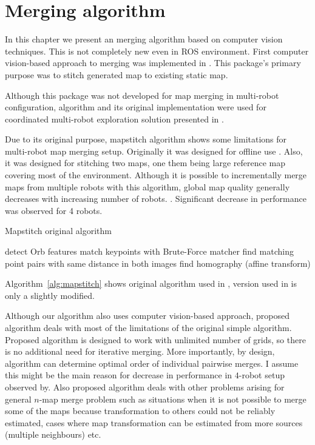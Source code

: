 \chapter{Merging algorithm}

In this chapter we present an merging algorithm based on computer vision techniques. This is not completely new even in ROS environment. First computer vision-based approach to merging was implemented in \cite{MapstitchROS}. This package's primary purpose was to stitch generated map to existing static map.

Although this package was not developed for map merging in multi-robot configuration, algorithm and its original implementation were used for coordinated multi-robot exploration solution presented in \cite{Andre2014}.

Due to its original purpose, mapstitch algorithm shows some limitations for multi-robot map merging setup. Originally it was designed for offline use \cite{Andre2014}. Also, it was designed for stitching two maps, one them being large reference map covering most of the environment. Although it is possible to incrementally merge maps from multiple robots with this algorithm, global map quality generally decreases with increasing number of robots. \cite{Andre2014}. Significant decrease in performance was observed for 4 robots\cite{Andre2014}.

\begin{algorithm}
    \caption{Mapstitch original algorithm}
    \label{alg:mapstitch}
    \begin{algorithmic}[1]
            \State detect Orb features
            \State match keypoints with Brute-Force matcher
            \State find matching point pairs with same distance in both images
            \State find homography (affine transform)
        \EndProcedure
    \end{algorithmic}
\end{algorithm}

Algorithm~\ref{alg:mapstitch} shows original algorithm used in \cite{MapstitchROS}, version used in \cite{Andre2014} is only a slightly modified.

Although our algorithm also uses computer vision-based approach, proposed algorithm deals with most of the limitations of the original simple algorithm. Proposed algorithm is designed to work with unlimited number of grids, so there is no additional need for iterative merging. More importantly, by design, algorithm can determine optimal order of individual pairwise merges. I assume this might be the main reason for decrease in performance in $4$-robot setup observed by\cite{Andre2014}. Also proposed algorithm deals with other problems arising for general $n$-map merge problem such as situations when it is not possible to merge some of the maps because transformation to others could not be reliably estimated, cases where map transformation can be estimated from more sources (multiple neighbours) etc.

